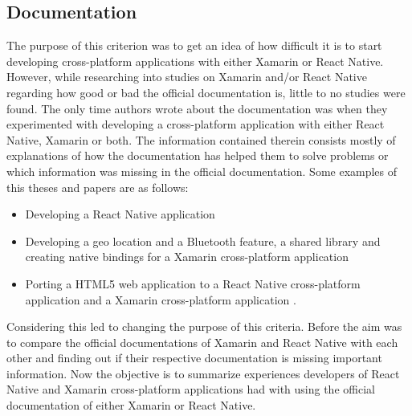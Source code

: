 \documentclass[Bachelor,BIF,english]{twbook}
\begin{document}
\subsection{Documentation}
The purpose of this criterion was to get an idea of how difficult it is to start developing cross-platform applications with either Xamarin or React Native. However, while researching into studies on Xamarin and/or React Native regarding how good or bad the official documentation is, little to no studies were found. The only time authors wrote about the documentation was when they experimented with developing a cross-platform application with either React Native, Xamarin or both. The information contained therein consists mostly of explanations of how the documentation has helped them to solve problems or which information was missing in the official documentation. Some examples of this theses and papers are as follows:
\begin{itemize}
\item Developing a React Native application \cite[p.~16-18]{Danielsson_2016}
\item Developing a geo location and a Bluetooth feature, a shared library and creating native bindings for a Xamarin cross-platform application \cite[p.~10-15]{Dickson_2013} 
\item Porting a HTML5 web application to a React Native cross-platform application and a Xamarin cross-platform application \cite[p.~33-69]{ZubaBernhard2017EdPb}.
\end{itemize}
Considering this led to changing the purpose of this criteria. Before the aim was to compare the official documentations of Xamarin and React Native with each other and finding out if their respective documentation is missing important information. Now the objective is to summarize experiences developers of React Native and Xamarin cross-platform applications had with using the official documentation of either Xamarin or React Native. 
\end{document}
